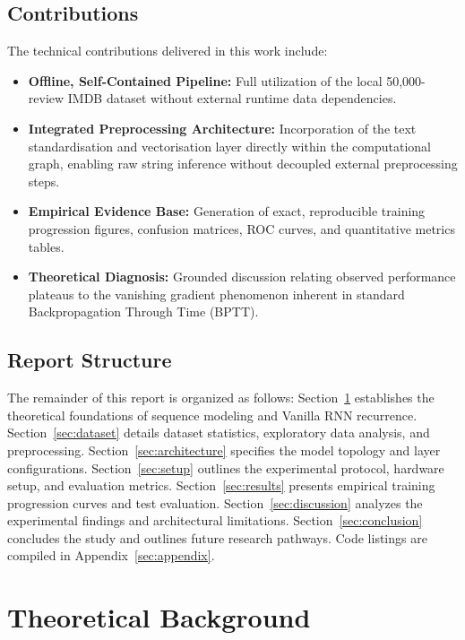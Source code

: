 \documentclass[11pt,a4paper]{article}
\begin{document}
\subsection{Contributions}
The technical contributions delivered in this work include:
\begin{itemize}
    \item \textbf{Offline, Self-Contained Pipeline:} Full utilization of the local 50,000-review IMDB dataset without external runtime data dependencies.
    \item \textbf{Integrated Preprocessing Architecture:} Incorporation of the text standardisation and vectorisation layer directly within the computational graph, enabling raw string inference without decoupled external preprocessing steps.
    \item \textbf{Empirical Evidence Base:} Generation of exact, reproducible training progression figures, confusion matrices, ROC curves, and quantitative metrics tables.
    \item \textbf{Theoretical Diagnosis:} Grounded discussion relating observed performance plateaus to the vanishing gradient phenomenon inherent in standard Backpropagation Through Time (BPTT).
\end{itemize}

\subsection{Report Structure}
The remainder of this report is organized as follows: Section~\ref{sec:theory} establishes the theoretical foundations of sequence modeling and Vanilla RNN recurrence. Section~\ref{sec:dataset} details dataset statistics, exploratory data analysis, and preprocessing. Section~\ref{sec:architecture} specifies the model topology and layer configurations. Section~\ref{sec:setup} outlines the experimental protocol, hardware setup, and evaluation metrics. Section~\ref{sec:results} presents empirical training progression curves and test evaluation. Section~\ref{sec:discussion} analyzes the experimental findings and architectural limitations. Section~\ref{sec:conclusion} concludes the study and outlines future research pathways. Code listings are compiled in Appendix~\ref{sec:appendix}.

\section{Theoretical Background}
\label{sec:theory}
\end{document}
